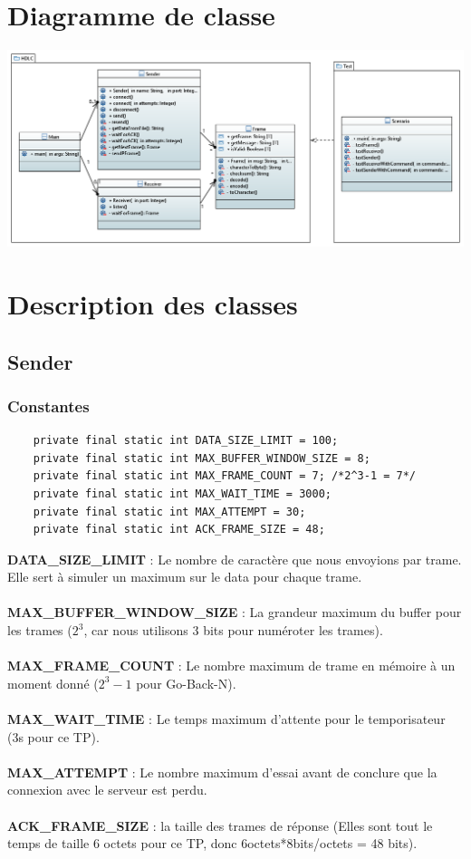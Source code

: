 \documentclass[a4paper,12pt]{article}
\begin{document}
	\begin{spacing}{1}
	\section*{Diagramme de classe}
	\includegraphics[scale=0.4]{ClassDiagram.png}
	\section*{Description des classes}
	\subsection*{Sender}
	\subsubsection*{Constantes}
	\begin{lstlisting}
	private final static int DATA_SIZE_LIMIT = 100; 
	private final static int MAX_BUFFER_WINDOW_SIZE = 8;
	private final static int MAX_FRAME_COUNT = 7; /*2^3-1 = 7*/
	private final static int MAX_WAIT_TIME = 3000;
	private final static int MAX_ATTEMPT = 30;
	private final static int ACK_FRAME_SIZE = 48;
	\end{lstlisting}
	\textbf{DATA\_SIZE\_LIMIT} : Le nombre de caractère que nous envoyions par trame. Elle sert à simuler un maximum sur le data pour chaque trame.\\\\
	\textbf{MAX\_BUFFER\_WINDOW\_SIZE} : La grandeur maximum du buffer pour les trames ($2^3$, car nous utilisons 3 bits pour numéroter les trames). \\\\
	\textbf{MAX\_FRAME\_COUNT} : Le nombre maximum de trame en mémoire à un moment donné ($2^3-1$ pour Go-Back-N).\\\\
	\textbf{MAX\_WAIT\_TIME} : Le temps maximum d'attente pour le temporisateur (3s pour ce TP).\\\\
	\textbf{MAX\_ATTEMPT} : Le nombre maximum d'essai avant de conclure que la connexion avec le serveur est perdu.\\\\
	\textbf{ACK\_FRAME\_SIZE} : la taille des trames de réponse (Elles sont tout le temps de taille 6 octets pour ce TP, donc 6octets*8bits/octets = 48 bits).

\end{spacing}
\end{document}
